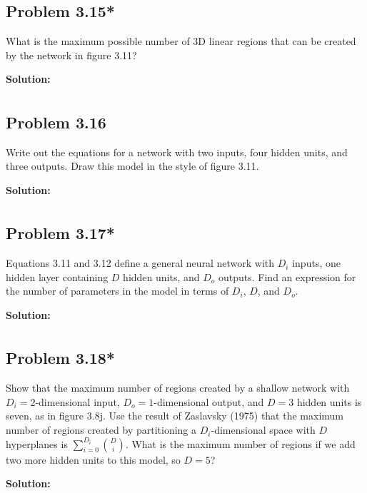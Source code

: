 \documentclass{article}
\begin{document}
    \subsection*{Problem 3.15*}
    What is the maximum possible number of 3D linear regions that can be created by the network in figure 3.11?

        \vspace{1cm}
        \textbf{Solution:}
        \begin{align*}
        \end{align*}

    \subsection*{Problem 3.16}
    Write out the equations for a network with two inputs, four hidden units, and three outputs. Draw this model in the style of figure 3.11.

        \vspace{1cm}
        \textbf{Solution:}
        \begin{align*}
        \end{align*}

    \subsection*{Problem 3.17*}
    Equations 3.11 and 3.12 define a general neural network with $D_i$ inputs, one hidden layer containing $D$ hidden units, and $D_o$ outputs. Find an expression for the number of parameters in the model in terms of $D_i$, $D$, and $D_o$.

        \vspace{1cm}
        \textbf{Solution:}
        \begin{align*}
        \end{align*}

    \subsection*{Problem 3.18*}
    Show that the maximum number of regions created by a shallow network with $D_i = 2$-dimensional input, $D_o = 1$-dimensional output, and $D = 3$ hidden units is seven, as in figure 3.8j. Use the result of Zaslavsky (1975) that the maximum number of regions created by partitioning a $D_i$-dimensional space with $D$ hyperplanes is $\sum_{i=0}^{D_i} \binom{D}{i}$. What is the maximum number of regions if we add two more hidden units to this model, so $D = 5$?

        \vspace{1cm}
        \textbf{Solution:}
        \begin{align*}
        \end{align*}
\end{document}
